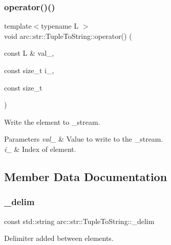 \subsubsection{\texorpdfstring{operator()()}{operator()()}}
{\footnotesize\ttfamily template$<$typename L $>$ \\
void arc\+::str\+::\+Tuple\+To\+String\+::operator() (\begin{DoxyParamCaption}\item[{const L \&}]{val\+\_\+,  }\item[{const size\+\_\+t}]{i\+\_\+,  }\item[{const size\+\_\+t}]{ }\end{DoxyParamCaption})\hspace{0.3cm}{\ttfamily [inline]}}

Write the element to \+\_\+stream.


\begin{DoxyParams}{Parameters}
{\em val\+\_\+} & Value to write to the \+\_\+stream. \\
\hline
{\em i\+\_\+} & Index of element. \\
\hline
\end{DoxyParams}


\subsection{Member Data Documentation}
\mbox{\label{structarc_1_1str_1_1_tuple_to_string_a822dbcaf492224fab6645ebf8dc7e5b1}} 
\subsubsection{\texorpdfstring{\+\_\+delim}{\_delim}}
{\footnotesize\ttfamily const std\+::string arc\+::str\+::\+Tuple\+To\+String\+::\+\_\+delim\hspace{0.3cm}{\ttfamily [private]}}



Delimiter added between elements. 

\mbox{\label{structarc_1_1str_1_1_tuple_to_string_adfa1e5289a45d5c1449694835b99fe68}} 
